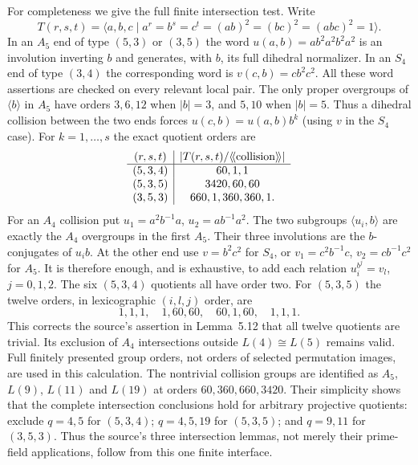 For completeness we give the full finite intersection test. Write
\[
 T(r,s,t)=\langle a,b,c\mid a^r=b^s=c^t=(ab)^2=(bc)^2=(abc)^2=1\rangle.
\]
In an $A_5$ end of type $(5,3)$ or $(3,5)$ the word
$u(a,b)=ab^2a^2b^2a^2$ is an involution inverting $b$ and generates,
with $b$, its full dihedral normalizer. In an $S_4$ end of type $(3,4)$
the corresponding word is $v(c,b)=cb^2c^2$. All these word assertions
are checked on every relevant local pair. The only proper overgroups
of $\langle b\rangle$ in $A_5$ have orders $3,6,12$ when $|b|=3$,
and $5,10$ when $|b|=5$. Thus a dihedral collision between the two ends
forces $u(c,b)=u(a,b)b^k$ (using $v$ in the $S_4$ case). For
$k=1,\ldots,s$ the exact quotient orders are
\[
\begin{array}{c|c}
 (r,s,t)& |T(r,s,t)/\langle\!\langle\hbox{collision}\rangle\!\rangle|\\\hline
 (5,3,4)&60,1,1\\
 (5,3,5)&3420,60,60\\
 (3,5,3)&660,1,360,360,1.
\end{array}
\]
For an $A_4$ collision put
$u_1=a^2b^{-1}a$, $u_2=ab^{-1}a^2$.
The two subgroups $\langle u_i,b\rangle$ are exactly the $A_4$
overgroups in the first $A_5$. Their three involutions are the
$b$-conjugates of $u_ib$. At the other end use $v=b^2c^2$ for $S_4$,
or $v_1=c^2b^{-1}c$, $v_2=cb^{-1}c^2$ for $A_5$.
It is therefore enough, and is exhaustive, to add each relation
$u_i^{b^j}=v_l$, $j=0,1,2$.
The six $(5,3,4)$ quotients all have order two.
For $(5,3,5)$ the twelve orders, in lexicographic $(i,l,j)$ order, are
\[
 1,1,1,\quad1,60,60,\quad60,1,60,\quad1,1,1.
\]
This corrects the source's assertion in Lemma~5.12 that all twelve
quotients are trivial. Its exclusion of $A_4$ intersections outside
$L(4)\cong L(5)$ remains valid. Full finitely presented group orders,
not orders of selected permutation images, are used in this calculation.
The nontrivial collision groups are identified as $A_5$, $L(9)$, $L(11)$
and $L(19)$ at orders $60,360,660,3420$. Their simplicity shows that the
complete intersection conclusions hold for arbitrary projective quotients:
exclude $q=4,5$ for $(5,3,4)$; $q=4,5,19$ for $(5,3,5)$; and $q=9,11$
for $(3,5,3)$. Thus the source's three intersection lemmas, not merely
their prime-field applications, follow from this one finite interface.

